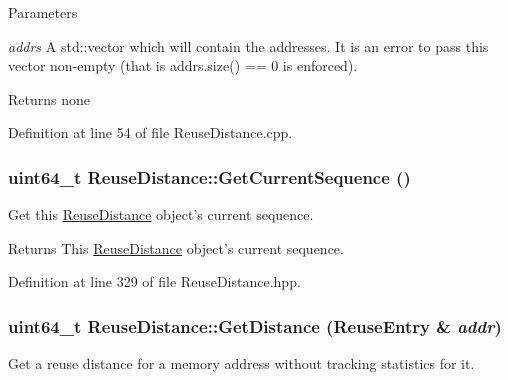 \begin{DoxyParams}{Parameters}
\item[{\em addrs}]A std::vector which will contain the addresses. It is an error to pass this vector non-\/empty (that is addrs.size() == 0 is enforced).\end{DoxyParams}
\begin{DoxyReturn}{Returns}
none 
\end{DoxyReturn}


Definition at line 54 of file ReuseDistance.cpp.

\hypertarget{class_reuse_distance_a5e88535f0b223c0e6d6ab1f4a1aa29ba}{
\subsubsection[{GetCurrentSequence}]{\setlength{\rightskip}{0pt plus 5cm}uint64\_\-t ReuseDistance::GetCurrentSequence ()}}
\label{class_reuse_distance_a5e88535f0b223c0e6d6ab1f4a1aa29ba}
Get this \hyperlink{class_reuse_distance}{ReuseDistance} object's current sequence.

\begin{DoxyReturn}{Returns}
This \hyperlink{class_reuse_distance}{ReuseDistance} object's current sequence. 
\end{DoxyReturn}


Definition at line 329 of file ReuseDistance.hpp.

\hypertarget{class_reuse_distance_ac70a23e9dc4b242f11d76e257e894bef}{
\subsubsection[{GetDistance}]{\setlength{\rightskip}{0pt plus 5cm}uint64\_\-t ReuseDistance::GetDistance ({\bf ReuseEntry} \& {\em addr})}}
\label{class_reuse_distance_ac70a23e9dc4b242f11d76e257e894bef}
Get a reuse distance for a memory address without tracking statistics for it.


